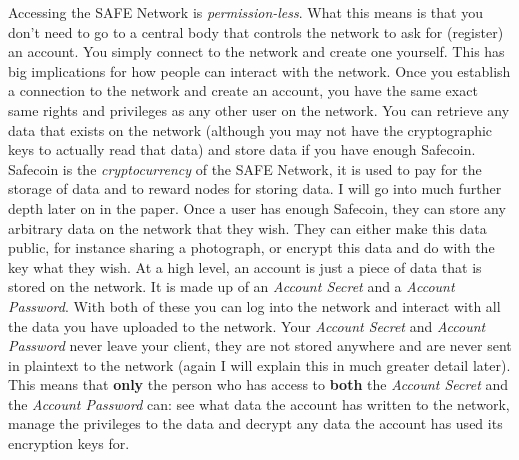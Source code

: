 \documentclass{l4proj}
\begin{document}
Accessing the SAFE Network is \textit{permission-less}. What this means is that you don't need to go to a central body that controls the network to ask for (register) an account. You simply connect to the network and create one yourself. This has big implications for how people can interact with the network. Once you establish a connection to the network and create an account, you have the same exact same rights and privileges as any other user on the network. You can retrieve any data that exists on the network (although you may not have the cryptographic keys to actually read that data) and store data if you have enough Safecoin. Safecoin is the \textit{cryptocurrency} of the SAFE Network, it is used to pay for the storage of data and to reward nodes for storing data. I will go into much further depth later on in the paper. Once a user has enough Safecoin, they can store any arbitrary data on the network that they wish. They can either make this data public, for instance sharing a photograph, or encrypt this data and do with the key what they wish. At a high level, an account is just a piece of data that is stored on the network. It is made up of an \textit{Account Secret} and a \textit{Account Password}. With both of these you can log into the network and interact with all the data you have uploaded to the network. Your \textit{Account Secret} and \textit{Account Password} never leave your client, they are not stored anywhere and are never sent in plaintext to the network (again I will explain this in much greater detail later). This means that \textbf{only} the person who has access to \textbf{both} the \textit{Account Secret} and the \textit{Account Password} can: see what data the account has written to the network, manage the privileges to the data and decrypt any data the account has used its encryption keys for.
\end{document}
